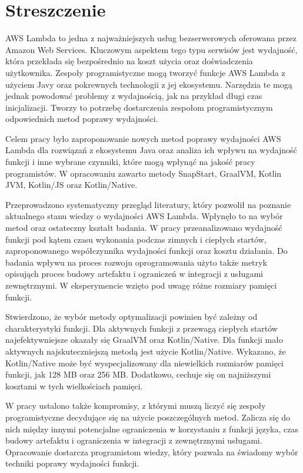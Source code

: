 \section*{Streszczenie}

AWS Lambda to jedna z najważniejszych usług bezserwerowych oferowana przez Amazon Web Services.
Kluczowym aspektem tego typu serwisów jest wydajność, która przekłada się bezpośrednio na koszt użycia oraz doświadczenia użytkownika.
Zespoły programistyczne mogą tworzyć funkcje AWS Lambda z użyciem Javy oraz pokrewnych technologii z jej ekosystemu.
Narzędzia te mogą jednak powodować problemy z wydajnością, jak na przykład długi czas inicjalizacji.
Tworzy to potrzebę dostarczenia zespołom programistycznym odpowiednich metod poprawy wydajności.

Celem pracy było zaproponowanie nowych metod poprawy wydajności AWS Lambda dla rozwiązań z ekosystemu Java oraz analiza ich wpływu na wydajność funkcji i inne wybrane czynniki, które mogą wpłynąć na jakość pracy programistów.
W opracowaniu zawarto metody SnapStart, GraalVM, Kotlin JVM, Kotlin/JS oraz Kotlin/Native.

Przeprowadzono systematyczny przegląd literatury, który pozwolił na poznanie aktualnego stanu wiedzy o wydajności AWS Lambda.
Wpłynęło to na wybór metod oraz ostateczny kształt badania.
W pracy przeanalizowano wydajność funkcji pod kątem czasu wykonania podczas zimnych i ciepłych startów, zaproponowanego współczynnika wydajności funkcji oraz kosztu działania.
Do badania wpływu na proces rozwoju oprogramowania użyto także metryk opisująch proces budowy artefaktu i ograniczeń w integracji z usługami zewnętrznymi.
W eksperymencie wzięto pod uwagę różne rozmiary pamięci funkcji.

Stwierdzono, że wybór metody optymalizacji powinien być zależny od charakterystyki funkcji.
Dla aktywnych funkcji z przewagą ciepłych startów najefektywniejsze okazały się GraalVM oraz Kotlin/Native.
Dla funkcji mało aktywnych najskuteczniejszą metodą jest użycie Kotlin/Native.
Wykazano, że Kotlin/Native może być wyspecjalizowany dla niewielkich rozmiarów pamięci funkcji, jak 128 MB oraz 256 MB.
Dodatkowo, cechuje się on najniższymi kosztami w tych wielkościach pamięci.

W pracy ustalono także kompromisy, z którymi muszą liczyć się zespoły programistyczne decydujące się na użycie poszczególnych metod.
Zalicza się do nich między innymi potencjalne ograniczenia w korzystaniu z funkcji języka, czas budowy artefaktu i ograniczenia w integracji z zewnętrznymi usługami.
Opracowanie dostarcza programistom wiedzy, który pozwala na świadomy wybór techniki poprawy wydajności funkcji.

